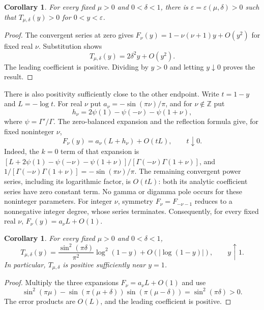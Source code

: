 \documentclass[11pt]{article}
\newtheorem{corollary}[theorem]{Corollary}
\newcommand{\F}{F}
\begin{document}
\begin{corollary}\label{cor:local}
For every fixed $\mu>0$ and $0<\delta<1$, there is
$\varepsilon=\varepsilon(\mu,\delta)>0$ such that
$T_{\mu,\delta}(y)>0$ for $0<y<\varepsilon$.
\end{corollary}
\begin{proof}
The convergent series at zero gives
$\F_\nu(y)=1-\nu(\nu+1)y+O(y^2)$ for fixed real $\nu$.
Substitution shows
\[
 T_{\mu,\delta}(y)=2\delta^2 y+O(y^2).
\]
The leading coefficient is positive. Dividing by $y>0$ and letting
$y\downarrow0$ proves the result.
\end{proof}
There is also positivity sufficiently close to the other endpoint.
Write $t=1-y$ and $L=-\log t$. For real $\nu$ put
$a_\nu=-\sin(\pi\nu)/\pi$, and for $\nu\notin\mathbb Z$ put
\[
 h_\nu=2\psi(1)-\psi(-\nu)-\psi(1+\nu),
\]
where $\psi=\Gamma'/\Gamma$. The zero-balanced expansion
\cite[Eq.~15.8.10, $m=0$]{dlmfcontinuation} and the reflection formula
\cite[Eq.~5.5.3]{dlmfgamma} give, for fixed noninteger $\nu$,
\begin{equation}\label{eq:asymptotic}
 \F_\nu(y)=a_\nu(L+h_\nu)+O(tL),\qquad t\downarrow0.
\end{equation}
Indeed, the $k=0$ term of that expansion is
$[L+2\psi(1)-\psi(-\nu)-\psi(1+\nu)]/
[\Gamma(-\nu)\Gamma(1+\nu)]$, and
$1/[\Gamma(-\nu)\Gamma(1+\nu)]=-\sin(\pi\nu)/\pi$.
The remaining convergent power series, including its logarithmic factor,
is $O(tL)$: both its analytic coefficient series have zero constant term.
No gamma or digamma pole occurs for these noninteger parameters.
For integer $\nu$, symmetry $\F_\nu=\F_{-\nu-1}$ reduces to a
nonnegative integer degree, whose series terminates. Consequently,
for every fixed real $\nu$, $\F_\nu(y)=a_\nu L+O(1)$.

\begin{corollary}\label{cor:endpoint}
For every fixed $\mu>0$ and $0<\delta<1$,
\begin{equation}\label{eq:endpoint}
 T_{\mu,\delta}(y)=\frac{\sin^2(\pi\delta)}{\pi^2}
                 \log^2(1-y)+O(|\log(1-y)|),\qquad y\uparrow1.
\end{equation}
In particular, $T_{\mu,\delta}$ is positive sufficiently near $y=1$.
\end{corollary}
\begin{proof}
Multiply the three expansions $\F_\nu=a_\nu L+O(1)$ and use
\[
 \sin^2(\pi\mu)-\sin(\pi(\mu+\delta))\sin(\pi(\mu-\delta))
 =\sin^2(\pi\delta)>0.
\]
The error products are $O(L)$, and the leading coefficient is positive.
\end{proof}
\end{document}
